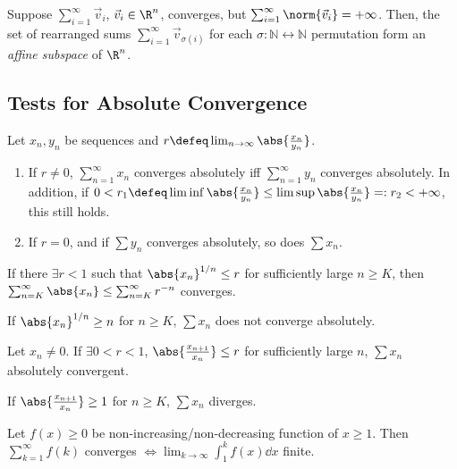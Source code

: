 \begin{theorem}
    Suppose $\sum_{i=1}^{\infty} \vec{v}_i$, $\vec{v}_i \in \R^n$, converges, but $\sum_{i=1}^\infty \norm{\vec{v}_i} = + \infty$. Then, the set of rearranged sums $\sum_{i=1}^\infty \vec{v}_{\sigma(i)}$ for each $\sigma : \mathbb{N} \leftrightarrow \mathbb{N}$ permutation form an \emph{affine subspace } of $\R^n$.
\end{theorem}

\subsection{Tests for Absolute Convergence}

\begin{proposition}
    Let $x_n, y_n$ be sequences and $r \defeq \lim_{n \to \infty} \abs{\frac{x_n}{y_n}}$.
    \begin{enumerate}
        \item If $r \neq 0$, $\sum_{n=1}^\infty x_n$ converges absolutely iff $\sum_{n=1}^\infty y_n$ converges absolutely.
In addition, if $0 < r_1 \defeq \liminf \abs{\frac{x_n}{y_n}} \leq \limsup \abs{\frac{x_n}{y_n}} =: r_2 < + \infty$, this still holds.
        \item If $r = 0$, and if $\sum y_n$ converges absolutely, so does $\sum x_n$.
    \end{enumerate}
\end{proposition}

\begin{proposition}
    If there $\exists r < 1$ such that $\abs{x_n}^{1/n} \leq r$ for sufficiently large $n \geq K$, then $\sum_{n=K}^\infty \abs{x_n} \leq \sum_{n=K}^\infty r^{-n}$ converges.

    If $\abs{x_n}^{1/n} \geq n$ for $n \geq K$, $\sum x_n$ does not converge absolutely.
\end{proposition}

\begin{proposition}
    Let $x_n \neq 0$. If $\exists 0 < r < 1$, $\abs{\frac{x_{n+1}}{x_n}} \leq r$ for sufficiently large $n$, $\sum x_n$ absolutely convergent.

    If $\abs{\frac{x_{n+1}}{x_n}} \geq 1$ for $n \geq K$, $\sum x_n$ diverges.
\end{proposition}

\begin{proposition}
    Let $f(x) \geq 0$ be non-increasing/non-decreasing function of $x \geq 1$. Then $\sum_{k=1}^\infty f(k)$ converges $\iff \lim_{k\to \infty} \int_1^k f(x) \dd{x}$ finite.
\end{proposition}

